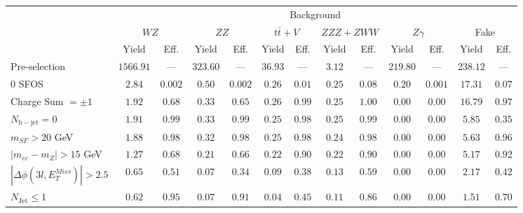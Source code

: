 \begin{tabular}{l||c|c||c|c||c|c||c|c||c|c||c|c}
\hline
 &  \multicolumn{12}{c||}{Background} \\
 & \multicolumn{2}{c||}{$WZ$} & \multicolumn{2}{c||}{$ZZ$} & \multicolumn{2}{c||}{$t\bar{t}+V$} & \multicolumn{2}{c||}{$ZZZ+ZWW$} & \multicolumn{2}{c||}{$Z\gamma$} & \multicolumn{2}{c||}{Fake}  \\ 
 & Yield & Eff. & Yield & Eff. & Yield & Eff. & Yield & Eff. & Yield & Eff. & Yield & Eff. \\
\hline\hline
Pre-selection &  $1566.91$ & --- &  $323.60$ &  --- &  $36.93$ &  --- &  $3.12$ & --- &  $219.80$ &  --- &  $238.12$ &  --- \\ 
\hline
0 SFOS &  $2.84$ &  $0.002$ &  $0.50$ &  $0.002$ &  $0.26$ &  $0.01$ &  $0.25$ &  $0.08$ &  $0.20$ &  $0.001$ &  $17.31$ &  $0.07$ \\ 
\hline
Charge Sum $= \pm 1$ &  $1.92$ &  $0.68$ &  $0.33$ &  $0.65$ &  $0.26$ &  $0.99$ &  $0.25$ &  $1.00$ &  $0.00$ &  $0.00$ &  $16.79$ &  $0.97$ \\ 
\hline
$N_{\mathrm{b-jet}} = 0$ &  $1.91$ &  $0.99$ &  $0.33$ &  $0.99$ &  $0.25$ &  $0.98$ &  $0.25$ &  $0.99$ &  $0.00$ &  $0.00$ &  $5.85$ &  $0.35$ \\ 
\hline
$m_{SF} > 20$ GeV &  $1.88$ &  $0.98$ &  $0.32$ &  $0.98$ &  $0.25$ &  $0.98$ &  $0.24$ &  $0.98$ &  $0.00$ &  $0.00$ &  $5.63$ &  $0.96$ \\ 
\hline
$|m_{ee} - m_{Z}| > 15$ GeV &  $1.27$ &  $0.68$ &  $0.21$ &  $0.66$ &  $0.22$ &  $0.90$ &  $0.22$ &  $0.90$ &  $0.00$ &  $0.00$ &  $5.17$ &  $0.92$ \\ 
\hline
$|\Delta\phi(3l,E_{T}^{Miss})| > 2.5$ &  $0.65$ &  $0.51$ &  $0.07$ &  $0.34$ &  $0.09$ &  $0.38$ &  $0.13$ &  $0.59$ &  $0.00$ &  $0.00$ &  $2.17$ &  $0.42$ \\ 
\hline
$N_{\mathrm{Jet}} \leq 1$ &  $0.62$ &  $0.95$ &  $0.07$ &  $0.91$ &  $0.04$ &  $0.45$ &  $0.11$ &  $0.86$ &  $0.00$ &  $0.00$ &  $1.51$ &  $0.70$ \\ 
\hline
\end{tabular}



